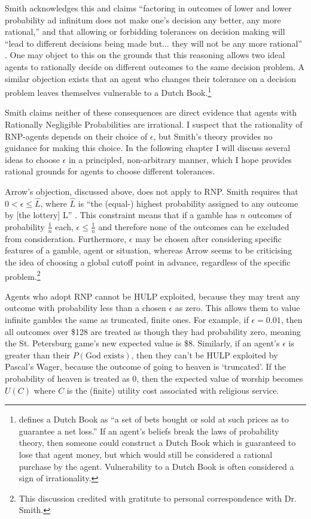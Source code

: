 \documentclass{article}
\begin{document}
Smith acknowledges this and claims ``factoring in outcomes of lower and lower probability ad infinitum does not make one’s decision any better, any more rational,'' and that allowing or forbidding tolerances on decision making will ``lead to different decisions being made \textemdash{} but... they will not be any more rational'' \citep[pg. 475]{smith2014evaluative}. One may object to this on the grounds that this reasoning allows two ideal agents to rationally decide on different outcomes to the same decision problem. A similar objection exists that an agent who changes their tolerance on a decision problem leaves themselves vulnerable to a Dutch Book.\footnote{\citet{hajek2008dutch} defines a Dutch Book as ``a set of bets bought or sold at such prices as to guarantee a net loss.'' If an agent's beliefs break the laws of probability theory, then someone could construct a Dutch Book which is guaranteed to lose that agent money, but which would still be considered a rational purchase by the agent. Vulnerability to a Dutch Book is often considered a sign of irrationality.} 

Smith claims neither of these consequences are direct evidence that agents with Rationally Negligible Probabilities are irrational. I suspect that the rationality of RNP-agents depends on their choice of \(\epsilon\), but Smith's theory provides no guidance for making this choice. In the following chapter I will discuss several ideas to choose \(\epsilon\) in a principled, non-arbitrary manner, which I hope provides rational grounds for agents to choose different tolerances. 

Arrow's objection, discussed above, does not apply to RNP. Smith requires that \(0 < \epsilon \leq \hat{L}\), where \(\hat{L}\) is ``the (equal-) highest probability assigned to any outcome by [the lottery] L'' \citep[pg. 479]{smith2014evaluative}. This constraint means that if a gamble has \(n\) outcomes of probability \(\frac{1}{n}\) each, \(\epsilon \leq \frac{1}{n}\) and therefore none of the outcomes can be excluded from consideration. Furthermore, \(\epsilon\) may be chosen after considering specific features of a gamble, agent or situation, whereas Arrow seems to be criticising the idea of choosing a global cutoff point in advance, regardless of the specific problem.\footnote{This discussion credited with gratitute to personal correspondence with Dr. Smith.}

Agents who adopt RNP cannot be HULP exploited, because they may treat any outcome with probability less than a chosen \(\epsilon\) as zero. This allows them to value infinite gambles the same as truncated, finite ones. For example, if \(\epsilon = 0.01\), then all outcomes over \$128 are treated as though they had probability zero, meaning the St. Petersburg game's new expected value is \$8. Similarly, if an agent's \(\epsilon\) is greater than their \(P(\text{God exists})\), then they can't be HULP exploited by Pascal's Wager, because the outcome of going to heaven is `truncated'. If the probability of heaven is treated as 0, then the expected value of worship becomes \(U(C)\) where \(C\) is the (finite) utility cost associated with religious service.
\end{document}
